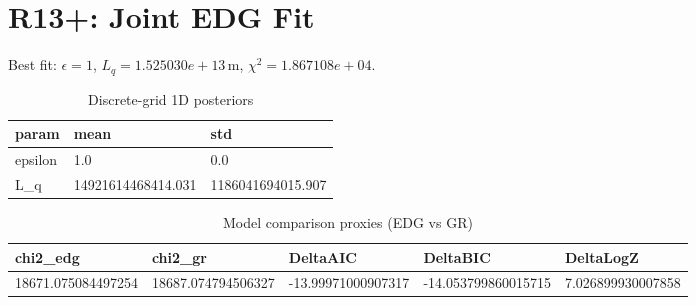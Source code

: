 \section{R13+: Joint EDG Fit}
Best fit: $\epsilon = 1$, $L_q = 1.525030e+13\,\mathrm{m}$, $\chi^2 = 1.867108e+04$.
\begin{table}[h!]
\centering
\caption{Discrete-grid 1D posteriors}
\label{tab:r13p_marg}
\begin{tabular}{l | l | l}
\hline
param & mean & std \\
\hline
epsilon & 1.0 & 0.0 \\
L_q & 14921614468414.031 & 1186041694015.907 \\
\hline
\end{tabular}
\end{table}

\begin{table}[h!]
\centering
\caption{Model comparison proxies (EDG vs GR)}
\label{tab:r13p_model}
\begin{tabular}{l | l | l | l | l}
\hline
chi2_edg & chi2_gr & DeltaAIC & DeltaBIC & DeltaLogZ \\
\hline
18671.075084497254 & 18687.074794506327 & -13.99971000907317 & -14.053799860015715 & 7.026899930007858 \\
\hline
\end{tabular}
\end{table}

